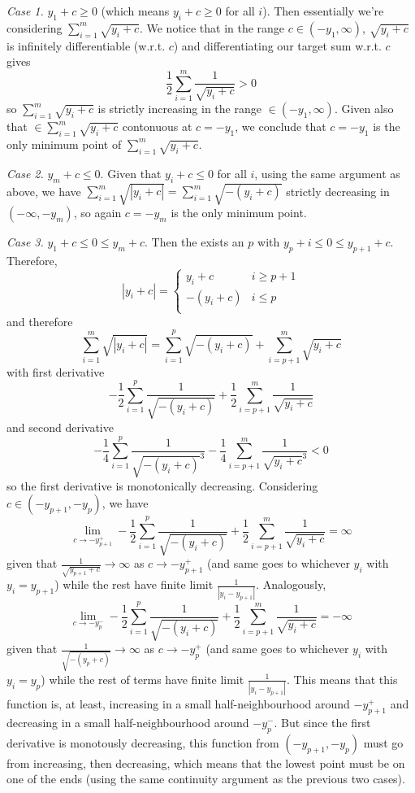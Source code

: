 \documentclass[11pt,a4paper]{article}
\newcommand{\<}{\langle}
\renewcommand{\>}{\rangle}
\newcommand{\dsum}{\displaystyle\sum}
\begin{document}
\begin{enumerate}
	\emph{Case 1.} $y_1+c\ge 0$ (which means $y_i+c\ge 0$ for all $i$). Then essentially we're considering $\dsum_{i=1}^m \sqrt{y_i+c}$. We notice that in the range $c\in (-y_1, \infty)$, $\sqrt{y_i+c}$ is infinitely differentiable (w.r.t. $c$) and differentiating our target sum w.r.t. $c$ gives 
	\[
	\frac 12 \dsum_{i=1}^m \frac{1}{\sqrt{y_i+c}} > 0
	\]
	so $\dsum_{i=1}^m \sqrt{y_i+c}$ is strictly increasing in the range $\in (-y_1, \infty)$. Given also that $\in \dsum_{i=1}^m \sqrt{y_i+c}$ contonuous at $c=-y_1$, we conclude that $c=-y_1$ is the only minimum point of $\dsum_{i=1}^m \sqrt{y_i+c}$. 
	
	\emph{Case 2.} $y_m+c\le 0$. Given that $y_i+c\le 0$ for all $i$, using the same argument as above, we have $\dsum_{i=1}^m \sqrt{|y_i+c|}=\dsum_{i=1}^m \sqrt{-(y_i+c)}$ strictly decreasing in $(-\infty, -y_m)$, so again $c=-y_m$ is the only minimum point. 
	
	\emph{Case 3.} $y_1+c\le 0\le y_m+c$. Then the exists an $p$ with $y_p+i\le 0\le y_{p+1}+c$. Therefore, 
	\[
	|y_i+c|=\begin{cases}
		y_i+c & i\ge p+1\\
		-(y_i+c) & i\le p\\
	\end{cases}
	\]
	and therefore 
	\[
	\dsum_{i=1}^m \sqrt{|y_i+c|}=\dsum_{i=1}^p \sqrt{-(y_i+c)}+\dsum_{i=p+1}^m \sqrt{y_i+c}
	\]
	with first derivative 
	\[
	-\frac 12\dsum_{i=1}^p \frac{1}{\sqrt{-(y_i+c)}}+\frac 12\dsum_{i=p+1}^m \frac {1}{\sqrt{y_i+c}}
	\]
	and second derivative
	\[
	-\frac 14\dsum_{i=1}^p \frac{1}{\sqrt{-(y_i+c)}^3}-\frac 14\dsum_{i=p+1}^m \frac {1}{\sqrt{y_i+c}^3} < 0
	\]
	so the first derivative is monotonically decreasing. 
	Considering $c\in (-y_{p+1}, -y_p)$, we have 
	\[
	\lim_{c\to -y_{p+1}^+}-\frac 12\dsum_{i=1}^p \frac{1}{\sqrt{-(y_i+c)}}+\frac 12\dsum_{i=p+1}^m \frac {1}{\sqrt{y_i+c}} = \infty
	\]
	given that $\frac{1}{\sqrt{y_{p+1}+c}}\to \infty$ as $c\to-y_{p+1}^+$ (and same goes to whichever $y_i$ with $y_i=y_{p+1}$) while the rest have finite limit $\frac{1}{|y_i-y_{p+1}|}$. 
	Analogously, 
	\[
	\lim_{c\to -y_{p}^-}-\frac 12\dsum_{i=1}^p \frac{1}{\sqrt{-(y_i+c)}}+\frac 12\dsum_{i=p+1}^m \frac {1}{\sqrt{y_i+c}} = -\infty
	\]
	given that $\frac{1}{\sqrt{-(y_p+c)}}\to \infty$ as $c\to-y_{p}^+$ (and same goes to whichever $y_i$ with $y_i=y_{p}$) while the rest of terms have finite limit $\frac{1}{|y_i-y_{p+1}|}$.
	This means that this function is, at least, increasing in a small half-neighbourhood around $-y_{p+1}^+$ and decreasing in a small half-neighbourhood around $-y_p^-$. But since the first derivative is monotously decreasing, this function from $(-y_{p+1}, -y_p)$ must go from increasing, then decreasing, which means that the lowest point must be on one of the ends (using the same continuity argument as the previous two cases). 
	

\end{enumerate}
\end{document}
